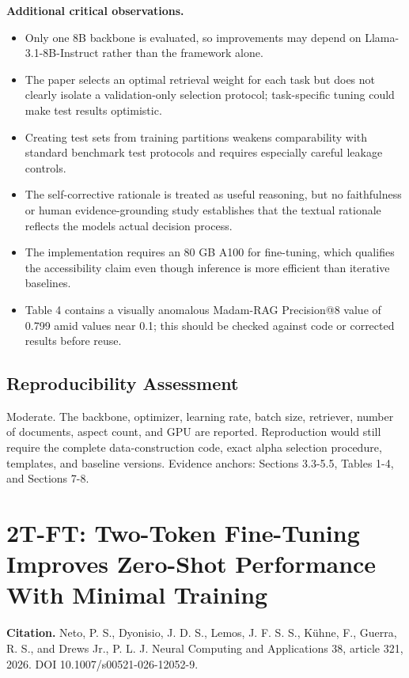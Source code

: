 \documentclass[11pt]{article}
\begin{document}
\textbf{Additional critical observations.}

\begin{itemize}
\item
  Only one 8B backbone is evaluated, so improvements may depend on
  Llama-3.1-8B-Instruct rather than the framework alone.
\item
  The paper selects an optimal retrieval weight for each task but does
  not clearly isolate a validation-only selection protocol;
  task-specific tuning could make test results optimistic.
\item
  Creating test sets from training partitions weakens comparability with
  standard benchmark test protocols and requires especially careful
  leakage controls.
\item
  The self-corrective rationale is treated as useful reasoning, but no
  faithfulness or human evidence-grounding study establishes that the
  textual rationale reflects the model\textquotesingle s actual decision
  process.
\item
  The implementation requires an 80 GB A100 for fine-tuning, which
  qualifies the accessibility claim even though inference is more
  efficient than iterative baselines.
\item
  Table 4 contains a visually anomalous Madam-RAG Precision@8 value of
  0.799 amid values near 0.1; this should be checked against code or
  corrected results before reuse.
\end{itemize}

\subsection{Reproducibility
Assessment}\label{reproducibility-assessment}

Moderate. The backbone, optimizer, learning rate, batch size, retriever,
number of documents, aspect count, and GPU are reported. Reproduction
would still require the complete data-construction code, exact alpha
selection procedure, templates, and baseline versions. Evidence anchors:
Sections 3.3-5.5, Tables 1-4, and Sections 7-8.

\clearpage
\section{2T-FT: Two-Token Fine-Tuning Improves Zero-Shot Performance
With Minimal
Training}\label{t-ft-two-token-fine-tuning-improves-zero-shot-performance-with-minimal-training}

\textbf{Citation.} Neto, P. S., Dyonisio, J. D. S., Lemos, J. F. S. S.,
Kühne, F., Guerra, R. S., and Drews Jr., P. L. J. Neural Computing and
Applications 38, article 321, 2026. DOI 10.1007/s00521-026-12052-9.
\end{document}
